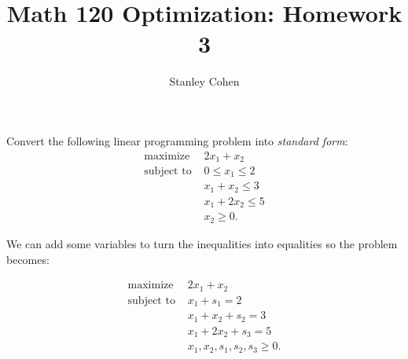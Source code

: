 \documentclass[12pt]{extarticle}
\title{Math 120 Optimization: Homework 3}
\author{Stanley Cohen}
\date{}
\theoremstyle{definition}
\begin{document}
\maketitle

\begin{problem}
 Convert the following linear programming problem into \textit{standard form}:
\begin{align*}
\text{maximize } &2x_1+x_2\\
\text{subject to } &0\leq x_1\leq 2\\
&x_1+x_2\leq 3\\
&x_1+2x_2\leq 5\\
&x_2\geq 0.
\end{align*}

We can add some variables to turn the inequalities into equalities so the problem becomes:

\begin{align*}
\text{maximize } &2x_1+x_2\\
\text{subject to } &x_1 + s_1 = 2\\
&x_1 + x_2 + s_2 = 3\\
&x_1 + 2x_2 + s_3 = 5\\
&x_1, x_2, s_1, s_2, s_3 \geq 0.
\end{align*}

\end{problem}
\end{document}
